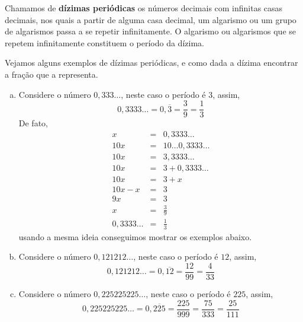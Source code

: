  \vskip0.3cm
 \colorbox{azul}{
 \begin{minipage}{0.9\linewidth}
 \begin{center}
  Chamamos de \textbf{dízimas periódicas} os números decimais com infinitas casas decimais, nos quais a partir de alguma casa decimal, um algarismo ou um grupo de algarismos passa a se repetir infinitamente. O algarismo ou algarismos que se repetem infinitamente constituem o período da dízima.
 \end{center}
 \end{minipage}}
 \vskip0.3cm

 \begin{exem} Vejamos alguns exemplos de dízimas periódicas, e como dada a dízima encontrar a fração que a representa.

  \begin{enumerate}[a)]
   \item Considere o número $0,333 \ldots$, neste caso o período é $3$, assim,
\begin{equation}
0,3333 \ldots= 0,\overline{3}= \frac{3}{9}= \frac{1}{3}
\end{equation}
   De fato,
   \begin{eqnarray*}
    x &=& 0,3333 \ldots \\
    10x &=& 10 \ldots 0,3333 \ldots \\
    10x &=& 3,3333 \ldots \\
    10x &=& 3 + 0,3333 \ldots \\
    10x &=& 3 + x \\
    10x - x &=& 3 \\
    9x &=& 3 \\
    x &=& \frac{3}{9} \\
    0,3333 \ldots &=& \frac{1}{3}
   \end{eqnarray*}
   usando a mesma ideia conseguimos mostrar os exemplos abaixo.

   \item Considere o número $0,121212 \ldots$, neste caso o período é $12$, assim,
\begin{equation}
0,121212 \ldots= 0,\overline{12}= \frac{12}{99}= \frac{4}{33}
\end{equation}

   \item Considere o número $0,225225225 \ldots$, neste caso o período é $225$, assim,
\begin{equation}
0,225225225 \ldots= 0,\overline{225}= \frac{225}{999}= \frac{75}{333}=\frac{25}{111}
\end{equation}


\end{enumerate}
\end{exem}
